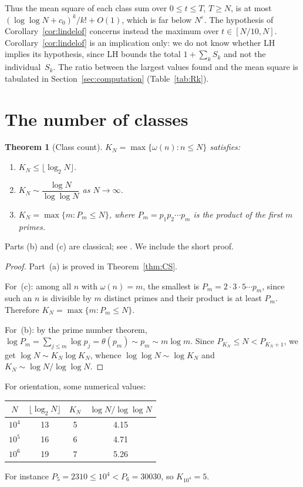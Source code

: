 \documentclass[11pt]{amsart}
\newtheorem{theorem}{Theorem}[section]
\theoremstyle{definition}
\theoremstyle{remark}
\begin{document}
Thus the mean square of each class sum over $0\le t\le T$, $T\ge N$, is at
most $(\log\log N+c_0)^k/k!+O(1)$, which is far below $N^\varepsilon$.
The hypothesis of Corollary~\ref{cor:lindelof} concerns instead the
maximum over $t\in[N/10,N]$.  Corollary~\ref{cor:lindelof} is an
implication only: we do not know whether LH implies its hypothesis, since
LH bounds the total $1+\sum_kS_k$ and not the individual~$S_k$.  The ratio
between the largest values found and the mean square is tabulated in
Section~\ref{sec:computation} (Table~\ref{tab:Rk}).

\section{The number of classes}\label{sec:thm3}

\begin{theorem}[Class count]\label{thm:Kcount}
$K_N = \max\{\omega(n) : n \le N\}$ satisfies:
\begin{enumerate}[label=(\alph*)]
  \item $K_N \le \lfloor \log_2 N \rfloor$.
  \item $K_N \sim \dfrac{\log N}{\log\log N}$ as $N \to \infty$.
  \item $K_N=\max\{m: P_m\le N\}$, where $P_m = p_1 p_2 \cdots p_m$ is
    the product of the first $m$ primes.
\end{enumerate}
\end{theorem}

Parts (b) and (c) are classical; see \cite[\S22.10]{hardy-wright2008}.
We include the short proof.

\begin{proof}
Part~(a) is proved in Theorem~\ref{thm:CS}.

For~(c): among all $n$ with $\omega(n) = m$, the smallest is
$P_m = 2 \cdot 3 \cdot 5 \cdots p_m$, since such an $n$ is divisible by
$m$ distinct primes and their product is at least $P_m$.  Therefore
$K_N = \max\{m : P_m \le N\}$.

For~(b): by the prime number theorem,
$\log P_m = \sum_{j\le m} \log p_j=\theta(p_m)\sim p_m \sim m \log m$.
Since $P_{K_N}\le N<P_{K_N+1}$, we get $\log N\sim K_N\log K_N$, whence
$\log\log N\sim\log K_N$ and $K_N\sim\log N/\log\log N$.
\end{proof}

For orientation, some numerical values:
\begin{center}
\begin{tabular}{cccc}
\toprule
$N$ & $\lfloor \log_2 N \rfloor$ & $K_N$ &
$\log N / \log\log N$ \\
\midrule
$10^4$ & 13 & 5 & 4.15 \\
$10^5$ & 16 & 6 & 4.71 \\
$10^6$ & 19 & 7 & 5.26 \\
\bottomrule
\end{tabular}
\end{center}
For instance $P_5=2310 \le 10^4<P_6=30030$, so $K_{10^4} = 5$.
\end{document}
